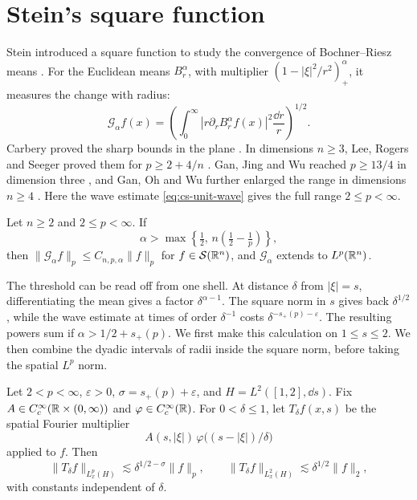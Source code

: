 \section{Stein's square function}\label{sec:stein-square}

Stein introduced a square function to study the convergence of
Bochner--Riesz means \cite[\S18, (18.1)]{Stein1958Square}.
For the Euclidean means \(B_r^\alpha\), with multiplier
\((1-|\xi|^2/r^2)_+^\alpha\), it measures the change with radius:
\[
 \mathcal G_\alpha f(x)=
 \left(\int_0^\infty |r\partial_r B_r^\alpha f(x)|^2
                         \frac{\dd r}{r}\right)^{1/2}.
\]
Carbery proved the sharp bounds in the plane
\cite[pp.~409--416]{Carbery1983Square}. In dimensions \(n\ge3\),
Lee, Rogers and Seeger proved them for \(p\ge 2+4/n\)
\cite[Theorem~1.1]{LRS2012Square}. Gan, Jing and Wu reached
\(p\ge13/4\) in dimension three \cite[Theorem~1.1]{GJW2024Square},
and Gan, Oh and Wu further enlarged the range in dimensions \(n\ge4\)
\cite[Theorem~1.1]{GOW2025Square}. Here the wave estimate
\eqref{eq:cs-unit-wave} gives the full range \(2\le p<\infty\).

\begin{theorem}\label{thm:stein-square}
Let \(n\ge2\) and \(2\le p<\infty\). If
\[
 \alpha>\max\left\{\tfrac12,\,n\left(\tfrac12-\tfrac1p\right)\right\},
\]
then \(\|\mathcal G_\alpha f\|_p\le C_{n,p,\alpha}\|f\|_p\) for
\(f\in\mathcal S(\mathbb R^n)\), and \(\mathcal G_\alpha\) extends to \(L^p(\mathbb R^n)\).
\end{theorem}

The threshold can be read off from one shell. At distance \(\delta\)
from \(|\xi|=s\), differentiating the mean gives a factor
\(\delta^{\alpha-1}\). The square norm in \(s\) gives back
\(\delta^{1/2}\), while the wave estimate at times of order
\(\delta^{-1}\) costs \(\delta^{-s_+(p)-\varepsilon}\). The resulting
powers sum if \(\alpha>1/2+s_+(p)\). We first make this calculation
on \(1\le s\le2\). We then combine the dyadic intervals of radii inside
the square norm, before taking the spatial \(L^p\) norm.

\begin{lemma}\label{lem:square-shell}
Let \(2<p<\infty\), \(\varepsilon>0\), \(\sigma=s_+(p)+\varepsilon\),
and \(H=L^2([1,2],\dd s)\). Fix \(A\in C_c^\infty(\mathbb R\times(0,\infty))\)
and \(\varphi\in C_c^\infty(\mathbb R)\). For \(0<\delta\le1\), let
\(T_\delta f(x,s)\) be the spatial Fourier multiplier
\[
 A(s,|\xi|)\,\varphi\bigl((s-|\xi|)/\delta\bigr)
\]
applied to \(f\). Then
\[
 \|T_\delta f\|_{L^p_x(H)}\lesssim \delta^{1/2-\sigma}\|f\|_p,
 \qquad
 \|T_\delta f\|_{L^2_x(H)}\lesssim \delta^{1/2}\|f\|_2,
\]
with constants independent of \(\delta\).
\end{lemma}

